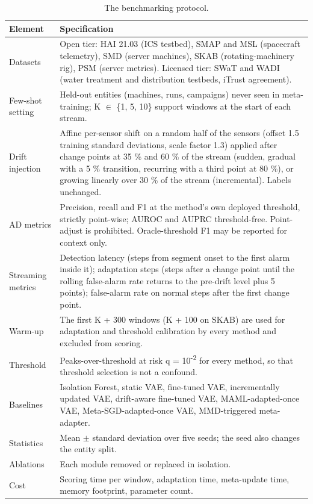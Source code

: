 \begin{table}[H]
\caption{The benchmarking protocol.}
\centering
\begin{tabularx}{\textwidth}{>{\raggedright\arraybackslash\hsize=0.523\hsize}X>{\raggedright\arraybackslash\hsize=1.477\hsize}X}
\toprule
\textbf{Element} & \textbf{Specification} \\
\midrule
Datasets & Open tier: HAI 21.03 (ICS testbed), SMAP and MSL (spacecraft telemetry), SMD (server machines), SKAB (rotating-machinery rig), PSM (server metrics). Licensed tier: SWaT and WADI (water treatment and distribution testbeds, iTrust agreement). \\
Few-shot setting & Held-out entities (machines, runs, campaigns) never seen in meta-training; K \ensuremath{\in} \{1, 5, 10\} support windows at the start of each stream. \\
Drift injection & Affine per-sensor shift on a random half of the sensors (offset 1.5 training standard deviations, scale factor 1.3) applied after change points at 35 \% and 60 \% of the stream (sudden, gradual with a 5 \% transition, recurring with a third point at 80 \%), or growing linearly over 30 \% of the stream (incremental). Labels unchanged. \\
AD metrics & Precision, recall and F1 at the method's own deployed threshold, strictly point-wise; AUROC and AUPRC threshold-free. Point-adjust is prohibited. Oracle-threshold F1 may be reported for context only. \\
Streaming metrics & Detection latency (steps from segment onset to the first alarm inside it); adaptation steps (steps after a change point until the rolling false-alarm rate returns to the pre-drift level plus 5 points); false-alarm rate on normal steps after the first change point. \\
Warm-up & The first K + 300 windows (K + 100 on SKAB) are used for adaptation and threshold calibration by every method and excluded from scoring. \\
Threshold & Peaks-over-threshold \citep{siffer2017pot} at risk q = 10\textsuperscript{-2} for every method, so that threshold selection is not a confound. \\
Baselines & Isolation Forest, static VAE, fine-tuned VAE, incrementally updated VAE, drift-aware fine-tuned VAE, MAML-adapted-once VAE, Meta-SGD-adapted-once VAE, MMD-triggered meta-adapter. \\
Statistics & Mean \ensuremath{\pm} standard deviation over five seeds; the seed also changes the entity split. \\
Ablations & Each module removed or replaced in isolation. \\
Cost & Scoring time per window, adaptation time, meta-update time, memory footprint, parameter count. \\
\bottomrule
\end{tabularx}
\end{table}

